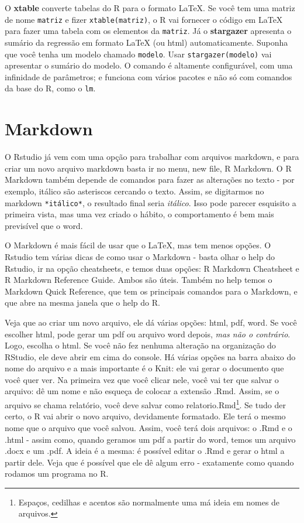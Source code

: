 \documentclass[
]{book}
\begin{document}
O \textbf{xtable} converte tabelas do R para o formato LaTeX. Se você tem uma matriz de nome \texttt{matriz} e fizer \texttt{xtable(matriz)}, o R vai fornecer o código em LaTeX para fazer uma tabela com os elementos da \texttt{matriz}. Já o \textbf{stargazer} apresenta o sumário da regressão em formato LaTeX (ou html) automaticamente. Suponha que você tenha um modelo chamado \texttt{modelo}. Usar \texttt{stargazer(modelo)} vai apresentar o sumário do modelo. O comando é altamente configurável, com uma infinidade de parâmetros; e funciona com vários pacotes e não só com comandos da base do R, como o \texttt{lm}.

\hypertarget{markdown}{%
\section{Markdown}\label{markdown}}

O Rstudio já vem com uma opção para trabalhar com arquivos markdown, e para criar um novo arquivo markdown basta ir no menu, new file, R Markdown. O R Markdown também depende de comandos para fazer as alterações no texto - por exemplo, itálico são asteriscos cercando o texto. Assim, se digitarmos no markdown \texttt{*itálico*}, o resultado final seria \emph{itálico}. Isso pode parecer esquisito a primeira vista, mas uma vez criado o hábito, o comportamento é bem mais previsível que o word.

O Markdown é mais fácil de usar que o LaTeX, mas tem menos opções. O Rstudio tem várias dicas de como usar o Markdown - basta olhar o help do Rstudio, ir na opção cheatsheets, e temos duas opções: R Markdown Cheatsheet e R Markdown Reference Guide. Ambos são úteis. Também no help temos o Markdown Quick Reference, que tem os principais comandos para o Markdown, e que abre na mesma janela que o help do R.

Veja que ao criar um novo arquivo, ele dá várias opções: html, pdf, word. Se você escolher html, pode gerar um pdf ou arquivo word depois, \emph{mas não o contrário}. Logo, escolha o html. Se você não fez nenhuma alteração na organização do RStudio, ele deve abrir em cima do console. Há várias opções na barra abaixo do nome do arquivo e a mais importante é o Knit: ele vai gerar o documento que você quer ver. Na primeira vez que você clicar nele, você vai ter que salvar o arquivo: dê um nome e não esqueça de colocar a extensão .Rmd. Assim, se o arquivo se chama relatório, você deve salvar como relatorio.Rmd\footnote{Espaços, cedilhas e acentos são normalmente uma má ideia em nomes de arquivos.}. Se tudo der certo, o R vai abrir o novo arquivo, devidamente formatado. Ele terá o mesmo nome que o arquivo que você salvou. Assim, você terá dois arquivos: o .Rmd e o .html - assim como, quando geramos um pdf a partir do word, temos um arquivo .docx e um .pdf. A ideia é a mesma: é possível editar o .Rmd e gerar o html a partir dele. Veja que é possível que ele dê algum erro - exatamente como quando rodamos um programa no R.
\end{document}
